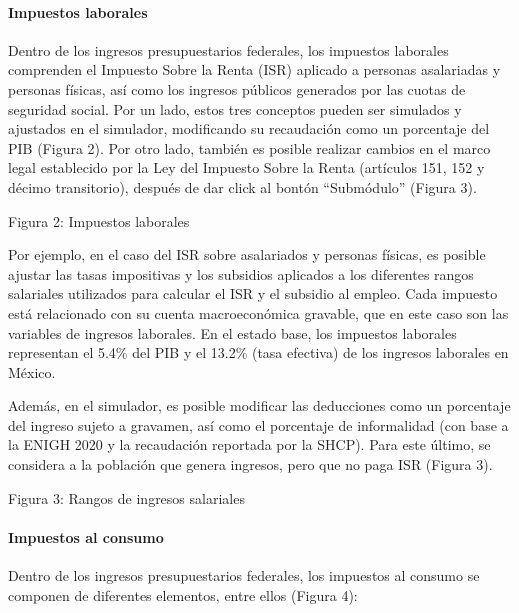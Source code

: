 \hypertarget{impuestos-laborales}{%
\paragraph{Impuestos laborales}\label{impuestos-laborales}}

Dentro de los ingresos presupuestarios federales, los impuestos
laborales comprenden el Impuesto Sobre la Renta (ISR) aplicado a
personas asalariadas y personas físicas, así como los ingresos públicos
generados por las cuotas de seguridad social. Por un lado, estos tres
conceptos pueden ser simulados y ajustados en el simulador, modificando
su recaudación como un porcentaje del PIB (Figura 2). Por otro lado,
también es posible realizar cambios en el marco legal establecido por la
Ley del Impuesto Sobre la Renta (artículos 151, 152 y décimo
transitorio), después de dar click al bontón ``Submódulo'' (Figura 3).

Figura 2: Impuestos laborales


Por ejemplo, en el caso del ISR sobre asalariados y personas físicas, es
posible ajustar las tasas impositivas y los subsidios aplicados a los
diferentes rangos salariales utilizados para calcular el ISR y el
subsidio al empleo. Cada impuesto está relacionado con su cuenta
macroeconómica gravable, que en este caso son las variables de ingresos
laborales. En el estado base, los impuestos laborales representan el
5.4\% del PIB y el 13.2\% (tasa efectiva) de los ingresos laborales en
México.

Además, en el simulador, es posible modificar las deducciones como un
porcentaje del ingreso sujeto a gravamen, así como el porcentaje de
informalidad (con base a la ENIGH 2020 y la recaudación reportada por la
SHCP). Para este último, se considera a la población que genera
ingresos, pero que no paga ISR (Figura 3).

Figura 3: Rangos de ingresos salariales


\hypertarget{impuestos-al-consumo}{%
\paragraph{Impuestos al consumo}\label{impuestos-al-consumo}}

Dentro de los ingresos presupuestarios federales, los impuestos al
consumo se componen de diferentes elementos, entre ellos (Figura 4):

